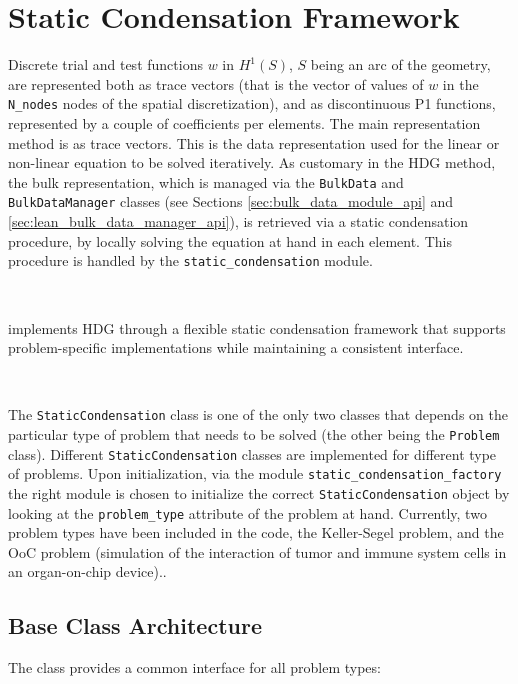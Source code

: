 \newcommand{\arc}{S}

\section{Static Condensation Framework}
\label{sec:static_condensation}

Discrete trial and test functions $w$ in $H^1(\arc)$, $\arc$ being an arc of the geometry, are represented both as trace vectors (that is the vector of values of $w$ in the {\tt N\_nodes} nodes of the spatial discretization), and as discontinuous P1 functions, represented by a couple of coefficients per elements. The main representation method is as trace vectors. This is the data representation used for the linear or non-linear equation to be solved iteratively. As customary in the HDG method, the bulk representation, which is managed via the  {\tt BulkData} and {\tt BulkDataManager} classes (see Sections \ref{sec:bulk_data_module_api} and \ref{sec:lean_bulk_data_manager_api}), is retrieved via a static condensation procedure, by locally solving the equation at hand in each element. This procedure is handled by the {\tt static\_condensation} module.

\

\bionetflux{} implements HDG through a flexible static condensation framework that supports problem-specific implementations while maintaining a consistent interface.

\

The {\tt StaticCondensation} class is one of the only two classes that depends on the particular type of problem that needs to be solved (the other being the {\tt Problem} class). Different {\tt StaticCondensation} classes are implemented for different type of problems. Upon initialization, via the module {\tt static\_condensation\_factory} the right module is chosen to initialize the correct {\tt StaticCondensation} object by looking at the {\tt problem\_type} attribute of the problem at hand. Currently, two problem types have been included in the code, the Keller-Segel problem, and the OoC problem (simulation of the interaction of tumor and immune system cells in an organ-on-chip device)..

\subsection{Base Class Architecture}

The  class provides a common interface for all problem types:

